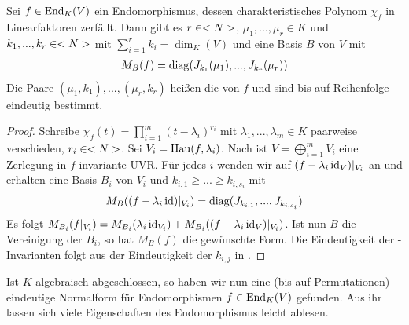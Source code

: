 \begin{theorem}
	Sei $f\in\operatorname{End}_K(V)$ ein Endomorphismus, dessen charakteristisches Polynom $\chi_f$ in Linearfaktoren zerfällt. Dann gibt es $r\in<N>$, $\mu_1,...,\mu_r\in K$ und $k_1,...,k_r\in <N>$ mit $\sum_{i=1}^r k_i=\dim_K(V)$ und eine Basis $B$ von $V$ mit
	\begin{align}
		M_B(f)=\operatorname{diag}(J_{k_1}(\mu_1),...,J_{k_r}(\mu_r))\notag
	\end{align} 
	Die Paare $(\mu_1,k_1),...,(\mu_r,k_r)$ heißen die  von $f$ und sind bis auf Reihenfolge eindeutig bestimmt.
\end{theorem}
\begin{proof}
	Schreibe $\chi_f(t)=\prod_{i=1}^m (t-\lambda_i)^{r_i}$ mit $\lambda_1,...,\lambda_m\in K$ paarweise verschieden, $r_i\in<N>$. Sei $V_i=\operatorname{Hau}(f,\lambda_i)$. Nach  ist $V=\bigoplus_{i=1}^m V_i$ eine Zerlegung in $f$-invariante UVR. Für jedes $i$ wenden wir  auf $(f-\lambda_i\operatorname{id}_V)\vert_{V_i}$ an und erhalten eine Basis $B_i$ von $V_i$ und $k_{i,1}\ge ...\ge k_{i,s_i}$ mit 
	\begin{align}
		M_B((f-\lambda_i\operatorname{id})\vert_{V_i})=\operatorname{diag}(J_{k_{i,1}},...,J_{k_{i,s_i}})\notag
	\end{align}
	Es folgt $M_{B_i}(f\vert_{V_i})=M_{B_i}(\lambda_i\operatorname{id}_{V_i})+M_{B_i}((f-\lambda_i\operatorname{id}_V)\vert_{V_i})$. Ist nun $B$ die Vereinigung der $B_i$, so hat $M_B(f)$ die gewünschte Form. Die Eindeutigkeit der -Invarianten folgt aus der Eindeutigkeit der $k_{i,j}$ in .
\end{proof}


\begin{remark}
	Ist $K$ algebraisch abgeschlossen, so haben wir nun eine (bis auf Permutationen) eindeutige Normalform für Endomorphismen $f\in\operatorname{End}_K(V)$ gefunden. Aus ihr lassen sich viele Eigenschaften des Endomorphismus leicht ablesen.
\end{remark}

